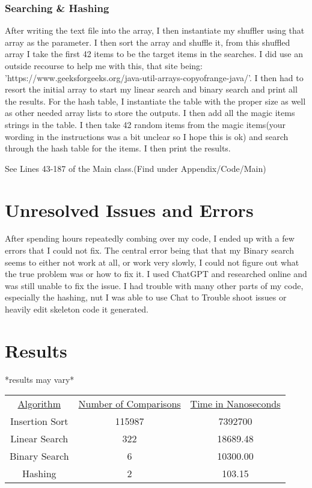 \documentclass[10pt]{article}
\begin{document}
\subsubsection{Searching & Hashing}
After writing the text file into the array, I then instantiate my shuffler using that array as the parameter. I then sort the array and shuffle it, from this shuffled array I take the first 42 items to be the target items in the searches. I did use an outside recourse to help me with this, that site being: 'https://www.geeksforgeeks.org/java-util-arrays-copyofrange-java/'. I then had to resort the initial array to start my linear search and binary search and print all the results. For the hash table, I instantiate the table with the proper size as well as other needed array lists to store the outputs. I then add all the magic items strings in the table. I then take 42 random items from the magic items(your wording in the instructions was a bit unclear so I hope this is ok) and search through the hash table for the items. I then print the results.

See Lines 43-187 of the Main class.(Find under Appendix/Code/Main)


\section{Unresolved Issues and Errors}
After spending hours repeatedly combing over my code, I ended up with a few errors that I could not fix. The central error being that that my Binary search seems to either not work at all, or work very slowly, I could not figure out what the true problem was or how to fix it. I used ChatGPT and researched online and was still unable to fix the issue. I had trouble with many other parts of my code, especially the hashing, nut I was able to use Chat to Trouble shoot issues or heavily edit skeleton code it generated.


\section{Results}
*results may vary*
\begin{center}
\begin{tabular}{ |c|c|c| } 
 \hline
 \underline{Algorithm} & \underline{Number of Comparisons} & \underline{Time in Nanoseconds} \\
 Insertion Sort & 115987 & 7392700 \\ 
 Linear Search & 322 & 18689.48 \\ 
 Binary Search     & 6 & 10300.00 \\ 
 Hashing     & 2 & 103.15 \\ 
 \hline
\end{tabular}
\end{center}
\end{document}
